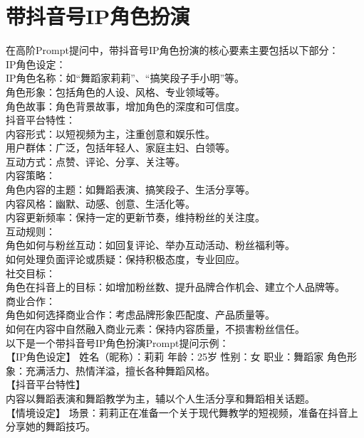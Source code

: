 \documentclass[12pt]{book}
\begin{document}
\section{带抖音号IP角色扮演}

在高阶Prompt提问中，带抖音号IP角色扮演的核心要素主要包括以下部分：\\

IP角色设定：\\
IP角色名称：如“舞蹈家莉莉”、“搞笑段子手小明”等。\\
角色形象：包括角色的人设、风格、专业领域等。\\
角色故事：角色背景故事，增加角色的深度和可信度。\\
抖音平台特性：\\
内容形式：以短视频为主，注重创意和娱乐性。\\
用户群体：广泛，包括年轻人、家庭主妇、白领等。\\
互动方式：点赞、评论、分享、关注等。\\
内容策略：\\
角色内容的主题：如舞蹈表演、搞笑段子、生活分享等。\\
内容风格：幽默、动感、创意、生活化等。\\
内容更新频率：保持一定的更新节奏，维持粉丝的关注度。\\
互动规则：\\
角色如何与粉丝互动：如回复评论、举办互动活动、粉丝福利等。\\
如何处理负面评论或质疑：保持积极态度，专业回应。\\
社交目标：\\
角色在抖音上的目标：如增加粉丝数、提升品牌合作机会、建立个人品牌等。\\
商业合作：\\
角色如何选择商业合作：考虑品牌形象匹配度、产品质量等。\\
如何在内容中自然融入商业元素：保持内容质量，不损害粉丝信任。\\
以下是一个带抖音号IP角色扮演Prompt提问示例：\\

【IP角色设定】 姓名（昵称）：莉莉 年龄：25岁 性别：女 职业：舞蹈家 角色形象：充满活力、热情洋溢，擅长各种舞蹈风格。\\

【抖音平台特性】\\

内容以舞蹈表演和舞蹈教学为主，辅以个人生活分享和舞蹈相关话题。\\
【情境设定】 场景：莉莉正在准备一个关于现代舞教学的短视频，准备在抖音上分享她的舞蹈技巧。\\
\end{document}
